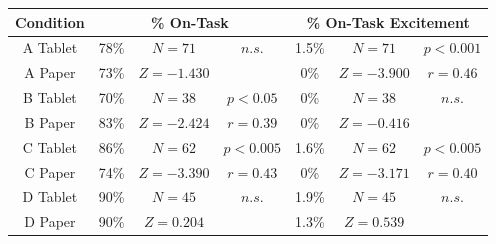 
\small
\begin{tabular}{|c|ccc|ccc|}
\hline
Condition & \multicolumn{3}{|c|}{\% On-Task} & \multicolumn{3}{|c|}{\% On-Task Excitement} \\
\hline
\hline
A Tablet & 78\% & \scriptsize{$N=71$} & \scriptsize{$n.s.$} & 1.5\% & \scriptsize{$N=71$} & \scriptsize{$p<0.001$}    \\
A Paper & 73\%& \scriptsize{$Z=-1.430$} &  & 0\%& \scriptsize{$Z=-3.900$} & \scriptsize{$r=0.46$}     \\
\hline
\hline
B Tablet & 70\% & \scriptsize{$N=38$} & \scriptsize{$p<0.05$} & 0\% & \scriptsize{$N=38$} & \scriptsize{$n.s.$}    \\
B Paper & 83\% & \scriptsize{$Z=-2.424$} & \scriptsize{$r=0.39$} & 0\% & \scriptsize{$Z=-0.416$} &     \\
\hline
\hline
C Tablet & 86\% & \scriptsize{$N=62$} & \scriptsize{$p<0.005$} & 1.6\% & \scriptsize{$N=62$} & \scriptsize{$p<0.005$}   \\
C Paper & 74\% & \scriptsize{$Z=-3.390$} & \scriptsize{$r=0.43$} & 0\% & \scriptsize{$Z=-3.171$} & \scriptsize{$r=0.40$}    \\
\hline
\hline
D Tablet & 90\% & \scriptsize{$N=45$} & \scriptsize{$n.s.$} & 1.9\% & \scriptsize{$N=45$} & \scriptsize{$n.s.$}    \\
D Paper & 90\% & \scriptsize{$Z=0.204$} & & 1.3\% & \scriptsize{$Z=0.539$} &     \\
\hline
\end{tabular}


